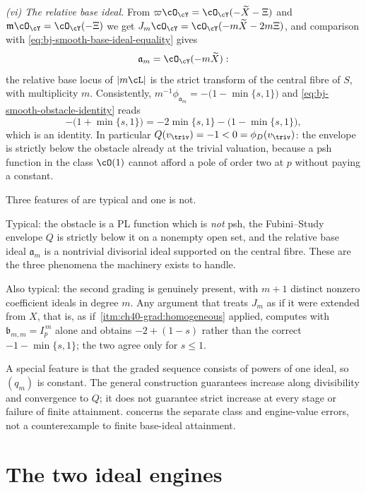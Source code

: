 \begin{example}
\emph{(vi) The relative base ideal.}  From
$\varpi\cO_{\cY}=\cO_{\cY}(-\widetilde X-\Xi)$ and
$\mathfrak m\cO_{\cY}=\cO_{\cY}(-\Xi)$ we get
$J_m\cO_{\cY}=\cO_{\cY}(-m\widetilde X-2m\Xi)$, and comparison with
\eqref{eq:bj-smooth-base-ideal-equality} gives
\[
 \mathfrak a_m=\cO_{\cY}(-m\widetilde X):
\]
the relative base locus of $|m\cL|$ is the strict transform of the central
fibre of $S$, with multiplicity $m$.  Consistently,
$m^{-1}\phi_{\mathfrak a_m}=-\bigl(1-\min\{s,1\}\bigr)$ and
\eqref{eq:bj-smooth-obstacle-identity} reads
\[
 -\bigl(1+\min\{s,1\}\bigr)
 =-2\min\{s,1\}-\bigl(1-\min\{s,1\}\bigr),
\]
which is an identity.  In particular $Q(v_{\triv})=-1<0=\phi_D(v_{\triv})$:
the envelope is strictly below the obstacle already at the trivial
valuation, because a psh function in the class $\cO(1)$ cannot afford a
pole of order two at $p$ without paying a constant.
\end{example}

\begin{remark}
\label{rem:ch40-p2-lessons}
Three features of  are typical and one is not.

Typical: the obstacle is a PL function which is \emph{not} psh, the
Fubini--Study envelope $Q$ is strictly below it on a nonempty open set,
and the relative base ideal $\mathfrak a_m$ is a nontrivial divisorial
ideal supported on the central fibre.  These are the three phenomena the
machinery exists to handle.

Also typical: the second grading is genuinely present, with $m+1$ distinct nonzero
coefficient ideals in degree $m$.  Any argument that treats $J_m$ as if it
were extended from $X$, that is, as if
\,\cref{itm:ch40-grad:homogeneous} applied,
computes with $\mathfrak b_{m,m}=I_p^{\,m}$ alone and obtains
$-2+(1-s)$ rather than the correct $-1-\min\{s,1\}$; the two agree only
for $s\le1$.

A special feature is that the graded sequence consists of powers of one
ideal, so $(q_m)$ is constant.  The general construction guarantees
increase along divisibility and convergence to $Q$; it does not guarantee
strict increase at every stage or failure of finite attainment.
 concerns the separate class and engine-value
errors, not a counterexample to finite base-ideal attainment.
\end{remark}

\section{The two ideal engines}
\label{sec:ch40-engines}

